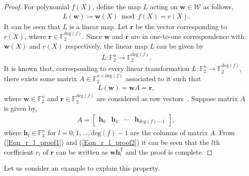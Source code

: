 \documentclass[10pt,journal]{IEEEtran}
\def \deg{{\mathrm{deg}}}
\begin{document}
\begin{proof}
% 
% 
For polynomial $f(X)$, define the map $L$ acting on $\mathbf{w} \in \mathcal{W}$ as follows,
% 
\begin{align}
%  
L(\mathbf{w}) \coloneqq \mathbf{w}(X) \bmod f(X) = r(X).
% 
\end{align}
% 
It can be seen that $L$ is a linear map.
Let $\mathbf{r}$ be the vector corresponding to $r(X)$, where $\mathbf{r} \in \mathbb{F}_2^{\deg(f)}$. 
Since $\mathbf{w}$ and $\mathbf{r}$ are in one-to-one correspondence with 
$\mathbf{w}(X)$ and $r(X)$ respectively, the linear map $L$ can be given by 
% 
\begin{align}
%  
L : \mathbb{F}_2^n \rightarrow \mathbb{F}_2^{\deg(f)}.
% 
\end{align}
% 
It is known that, corresponding to every linear transformation $L : \mathbb{F}_2^n \rightarrow \mathbb{F}_2^{\deg(f)}$, 
there exists some matrix $A \in \mathbb{F}_2^{n \times \deg(f)}$ associated to it such that
% 
\begin{align}
% 
L (\mathbf{w}) = \mathbf{w} A = \mathbf{r}, 
\label{Eqn_r_l_proof1}
% 
\end{align}
% 
where $\mathbf{w} \in \mathbb{F}_2^n$ and $\mathbf{r} \in \mathbb{F}_2^{\deg(f)}$ are considered as row vectors~\cite[Ch.~4]{Artin_Algebra}.
Suppose matrix $A$ is given by,
% 
\begin{align}
%  
A = \begin{bmatrix} \mathbf{h}_0 & \mathbf{h}_1 & \cdots & \mathbf{h}_{\deg(f)-1} \end{bmatrix},
\label{Eqn_r_l_proof2}
% 
\end{align}
% 
where $\mathbf{h}_l \in \mathbb{F}_2^n$ for $l = 0,1,\ldots,\deg(f)-1$ are the columns of matrix $A$.
From (\ref{Eqn_r_l_proof1}) and (\ref{Eqn_r_l_proof2}) it can be seen that the $l$th coefficient $r_l$ of $\mathbf{r}$
can be written as $\mathbf{w}\mathbf{h}_l^T$ and the proof is complete.
% 
% 
\end{proof}
% 
Let us consider an example to explain this property. 
% 
\end{document}
